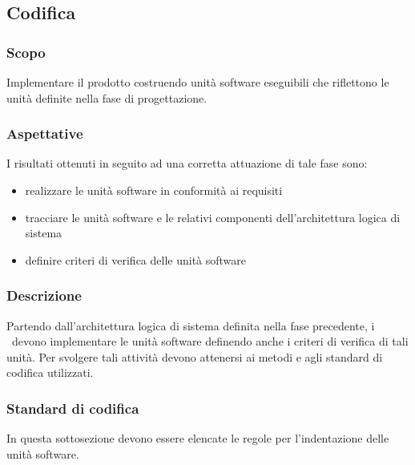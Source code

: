 \documentclass[../NormeDiProgetto.tex]{subfiles}
\begin{document}
		\subsection{Codifica}
			\subsubsection{Scopo}
				Implementare il prodotto costruendo unità software eseguibili che riflettono le unità definite nella fase di progettazione.
			\subsubsection{Aspettative}
				I risultati ottenuti in seguito ad una corretta attuazione di tale fase sono:
				\begin{itemize}
					\item realizzare le unità software in conformità ai requisiti
					\item tracciare le unità software e le relativi componenti dell'architettura logica di sistema
					\item definire criteri di verifica delle unità software
				\end{itemize}
			\subsubsection{Descrizione}
				Partendo dall'architettura logica di sistema definita nella fase precedente, i \programmatori\ devono implementare le unità software definendo anche i criteri di verifica di tali unità. Per svolgere tali attività devono attenersi ai metodi e agli standard di codifica utilizzati.
			\subsubsection{Standard di codifica}
				In questa sottosezione devono essere elencate le regole per l'indentazione delle unità software.
\end{document}

